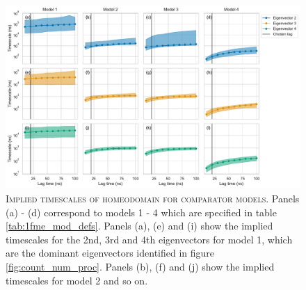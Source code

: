 \documentclass{article}
\begin{document}
\begin{figure}[h]
    \centering
    \includegraphics[width=1\textwidth]{figures/model_comparision_its/uvf.pdf}
    \caption{\textsc{Implied timescales of homeodomain for comparator models.} Panels (a) - (d) correspond to models 1 - 4 which are specified in table \ref{tab:1fme_mod_defs}. Panels (a), (e) and (i) show the implied timescales for the 2nd, 3rd and 4th eigenvectors for model 1, which are the dominant eigenvectors identified in figure \ref{fig:count_num_proc}.  Panels (b), (f) and (j) show the implied timescales for model 2 and so on.}
    \label{fig:uvf_its}
\end{figure}
\end{document}
